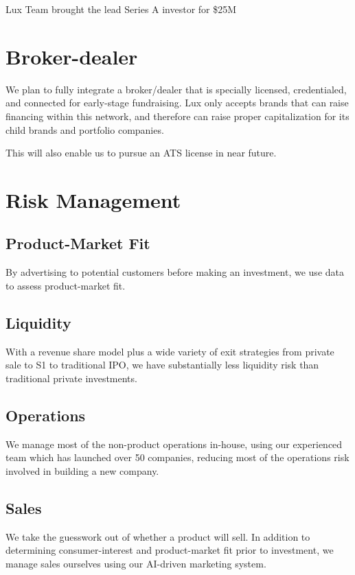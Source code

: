 \documentclass[11pt]{article}
\begin{document}
Lux Team brought the lead Series A investor for \$25M


\section{Broker-dealer}

We plan to fully integrate a broker/dealer that is specially licensed, credentialed, and connected for early-stage fundraising. Lux only accepts brands that can raise financing within this network, and therefore can raise proper capitalization for its child brands and portfolio companies.


This will also enable us to pursue an ATS license in near future.


\section{Risk Management}

\subsection{Product-Market Fit}

By advertising to potential customers before making an investment, we use data to assess product-market fit.


\subsection{Liquidity}

With a revenue share model plus a wide variety of exit strategies from private sale to S1 to traditional IPO, we have substantially less liquidity risk than traditional private investments.


\subsection{Operations}

We manage most of the non-product operations in-house, using our experienced team which has launched over 50 companies, reducing most of the operations risk involved in building a new company.


\subsection{Sales}

We take the guesswork out of whether a product will sell. In addition to determining consumer-interest and product-market fit prior to investment, we manage sales ourselves using our AI-driven marketing system.
\end{document}
